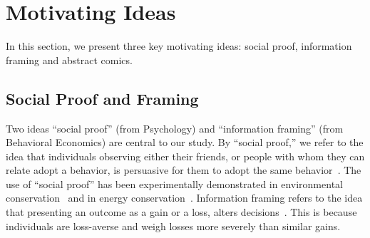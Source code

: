 \section{Motivating Ideas}
\label{sec:Motivating Ideas}
In this section, we present three key motivating ideas: social proof, information framing and abstract comics.

\subsection{Social Proof and Framing}
Two ideas ``social proof'' (from Psychology) and ``information framing'' (from Behavioral Economics) are central to our study. By ``social proof,'' we refer to the idea that individuals observing either their friends, or people with whom they can relate adopt a behavior, is persuasive for them to adopt the same behavior~\cite{Cialdini1993,Cialdini2004}. The use of ``social proof'' has been experimentally demonstrated in environmental conservation~\cite{goldstein2008room} and in energy conservation~\cite{schultz2007constructive}. Information framing refers to the idea that presenting an outcome as a gain or a loss, alters decisions~\cite{tversky1981framing,tversky1992advances}. This is because individuals are loss-averse and weigh losses more severely than similar gains.


